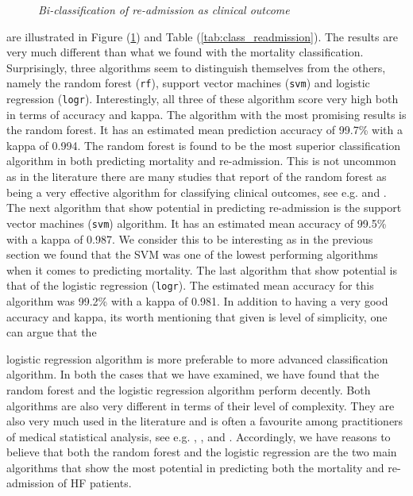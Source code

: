 \documentclass[../thesis.tex]{subfiles}
\begin{document}
\begin{figure}[h!]
    \centering
    \scalebox{.8}{}
    \caption[Bi-classification of re-admission as clinical outcome]{\textit{Bi-classification of re-admission as clinical outcome}}
    \label{fig:bi_class_read}
\end{figure}

\noindent are illustrated in Figure (\ref{fig:bi_class_read}) and Table (\ref{tab:class_readmission}). The results are very much different than what we found with the mortality classification. Surprisingly, three algorithms seem to distinguish themselves from the others, namely the random forest (\texttt{rf}), support vector machines (\texttt{svm}) and logistic regression (\texttt{logr}). Interestingly, all three of these algorithm score very high both in terms of accuracy and kappa. The algorithm with the most promising results is the random forest. It has an estimated mean prediction accuracy of 99.7\% with a kappa of 0.994. The random forest is found to be the most superior classification algorithm in both predicting mortality and re-admission. This is not uncommon as in the literature there are many studies that report of the random forest as being a very effective algorithm for classifying clinical outcomes, see e.g. \cite{austin2013using} and \cite{zolfaghar2013big}. The next algorithm that show potential in predicting re-admission is the support vector machines (\texttt{svm}) algorithm. It has an estimated mean accuracy of 99.5\% with a kappa of 0.987. We consider this to be interesting as in the previous section we found that the SVM was one of the lowest performing algorithms when it comes to predicting mortality. The last algorithm that show potential is that of the logistic regression (\texttt{logr}). The estimated mean accuracy for this algorithm was 99.2\% with a kappa of 0.981. In addition to having a very good accuracy and kappa, its worth mentioning that given is level of simplicity, one can argue that the  



\noindent logistic regression algorithm is more preferable to more advanced classification algorithm. In both the cases that we have examined, we have found that the random forest and the logistic regression algorithm perform decently. Both algorithms are also very different in terms of their level of complexity. They are also very much used in the literature and is often a favourite among practitioners of medical statistical analysis, see e.g. \cite{austin2013using}, \cite{zolfaghar2013big}, \cite{shah2014phenomapping} and \cite{panahiazar2015using}. Accordingly, we have reasons to believe that both the random forest and the logistic regression are the two main algorithms that show the most potential in predicting both the mortality and re-admission of HF patients.
\end{document}
